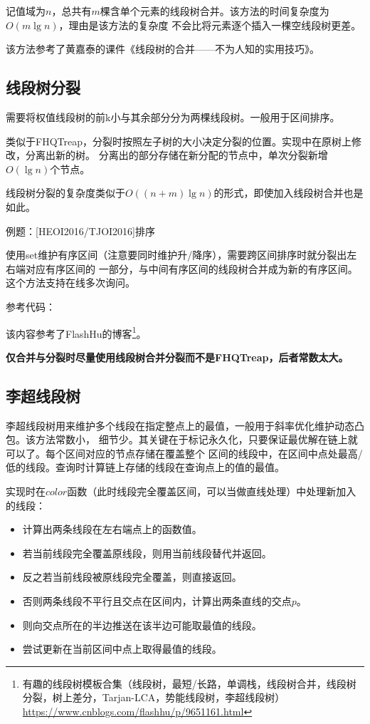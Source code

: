 记值域为$n$，总共有$m$棵含单个元素的线段树合并。该方法的时间复杂度为$O(m\lg n)$，理由是该方法的复杂度
不会比将元素逐个插入一棵空线段树更差。

该方法参考了黄嘉泰的课件《线段树的合并——不为人知的实用技巧》。
\subsection{线段树分裂}
需要将权值线段树的前k小与其余部分分为两棵线段树。一般用于区间排序。

类似于FHQTreap，分裂时按照左子树的大小决定分裂的位置。实现中在原树上修改，分离出新的树。
分离出的部分存储在新分配的节点中，单次分裂新增$O(\lg n)$个节点。

线段树分裂的复杂度类似于$O((n+m)\lg n)$的形式，即使加入线段树合并也是如此。

例题：[HEOI2016/TJOI2016]排序

使用set维护有序区间（注意要同时维护升/降序），需要跨区间排序时就分裂出左右端对应有序区间的
一部分，与中间有序区间的线段树合并成为新的有序区间。这个方法支持在线多次询问。

参考代码：

该内容参考了FlashHu的博客\footnote{
    有趣的线段树模板合集（线段树，最短/长路，单调栈，线段树合并，线段树分裂，树上差分，Tarjan-LCA，势能线段树，李超线段树）\\
    \url{https://www.cnblogs.com/flashhu/p/9651161.html}
}。

{\bfseries 仅合并与分裂时尽量使用线段树合并分裂而不是FHQTreap，后者常数太大。}
\subsection{李超线段树}
李超线段树用来维护多个线段在指定整点上的最值，一般用于斜率优化维护动态凸包。该方法常数小，
细节少。其关键在于标记永久化，只要保证最优解在链上就可以了。每个区间对应的节点存储在覆盖整个
区间的线段中，在区间中点处最高/低的线段。查询时计算链上存储的线段在查询点上的值的最值。

实现时在$color$函数（此时线段完全覆盖区间，可以当做直线处理）中处理新加入的线段：
\begin{itemize}
    \item 计算出两条线段在左右端点上的函数值。
    \item 若当前线段完全覆盖原线段，则用当前线段替代并返回。
    \item 反之若当前线段被原线段完全覆盖，则直接返回。
    \item 否则两条线段不平行且交点在区间内，计算出两条直线的交点$p$。
    \item 则向交点所在的半边推送在该半边可能取最值的线段。
    \item 尝试更新在当前区间中点上取得最值的线段。
\end{itemize}

